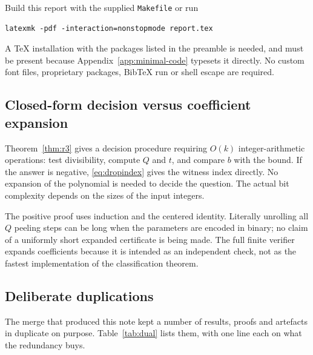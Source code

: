 \documentclass[11pt]{article}
\theoremstyle{research}
\theoremstyle{definition}
\numberwithin{equation}{section}
\begin{document}
Build this report with the supplied \texttt{Makefile} or run
\begin{lstlisting}[language={}]
latexmk -pdf -interaction=nonstopmode report.tex
\end{lstlisting}
A TeX installation with the packages listed in the preamble is needed, and
 must be present because
Appendix~\ref{app:minimal-code} typesets it directly. No custom font files,
proprietary packages, BibTeX run or shell escape are required.

\subsection{Closed-form decision versus coefficient expansion}
Theorem~\ref{thm:r3} gives a decision procedure requiring $O(k)$
integer-arithmetic operations: test divisibility, compute $Q$ and $t$,
and compare $b$ with the bound. If the answer is negative,
\eqref{eq:dropindex} gives the witness index directly.
No expansion of the polynomial is needed to decide the question.
The actual bit complexity depends on the sizes of the input integers.

The positive proof uses induction and the centered identity.
Literally unrolling all $Q$ peeling steps can be long when the parameters
are encoded in binary; no claim of a uniformly short expanded
certificate is being made. The full finite verifier expands coefficients
because it is intended as an independent check, not as the fastest
implementation of the classification theorem.

\subsection{Deliberate duplications}
The merge that produced this note kept a number of results, proofs and
artefacts in duplicate on purpose. Table~\ref{tab:dual} lists them, with
one line each on what the redundancy buys.
\end{document}
